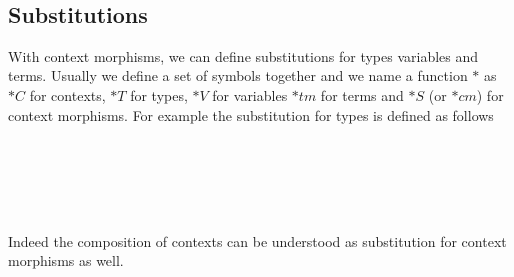 \documentclass{acm_proc_article-sp}
\begin{document}
{\begin{code}
\\
\>[0]\<[8]%
\>[8]\AgdaSymbol{(} \AgdaSymbol{:} \AgdaSymbol{\{} \AgdaSymbol{:}  \AgdaSymbol{\}}      \AgdaSymbol{(} \AgdaSymbol{))}  \<[45]%
\>[45]\<%
\\
\>[0]\<[8]%
\>[8]   \<[14]%
\>[14]\<%
\\
\>[0]\<[6]%
\>[6]     \<%
\\
\>  \AgdaSymbol{(} \AgdaSymbol{\_)} \AgdaSymbol{=}  \AgdaSymbol{\_}\<%
\\
%
\\
\>\<\end{code}
}


\subsection{Substitutions}

With context morphisms, we can define substitutions for types
variables and terms.  Usually we define a set of symbols together and
we name a function $*$ as $*C$ for contexts, $*T$ for types, $*V$ for
variables $*tm$ for terms and $*S$ (or $*cm$) for context morphisms. For example
the substitution for types is defined as follows

\begin{code}\>\<%
\\
\> \<[8]%
\>[8]\AgdaSymbol{:}  \AgdaSymbol{\}}          \<%
\\
\> \<[8]%
\>[8]\AgdaSymbol{:}   \AgdaSymbol{\}}     \AgdaSymbol{(} \AgdaSymbol{:}   \AgdaSymbol{)}   \AgdaSymbol{(} \AgdaFunction{[}  \AgdaFunction{]T}\AgdaSymbol{)}\<%
\\
\> \<[8]%
\>[8]\AgdaSymbol{:}   \AgdaSymbol{\}}     \AgdaSymbol{(} \AgdaSymbol{:}   \AgdaSymbol{)}   \AgdaSymbol{(} \AgdaFunction{[}  \AgdaFunction{]T}\AgdaSymbol{)} \<[59]%
\>[59]\<%
\\
\>\<\end{code}
Indeed the
composition of contexts can be understood as substitution for context morphisms as well.
\end{document}

